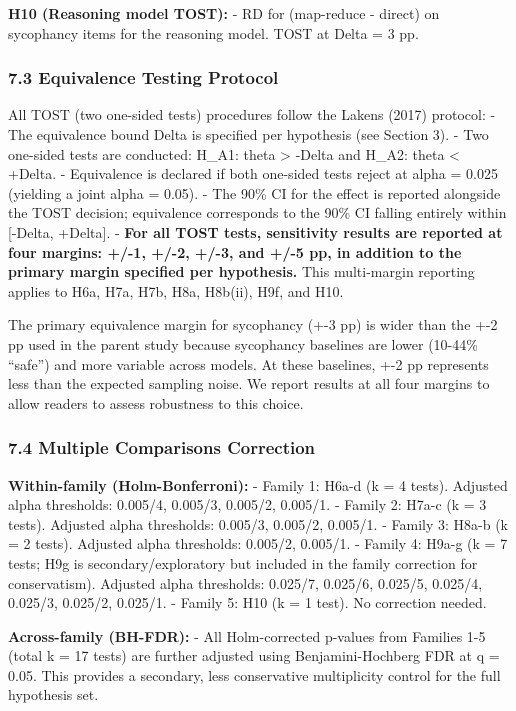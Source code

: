 \documentclass[
  11pt,
]{article}
\begin{document}
\textbf{H10 (Reasoning model TOST):} - RD for (map-reduce - direct) on
sycophancy items for the reasoning model. TOST at Delta = 3 pp.

\subsubsection{7.3 Equivalence Testing
Protocol}\label{equivalence-testing-protocol}

All TOST (two one-sided tests) procedures follow the Lakens (2017)
protocol: - The equivalence bound Delta is specified per hypothesis (see
Section 3). - Two one-sided tests are conducted: H\_A1: theta
\textgreater{} -Delta and H\_A2: theta \textless{} +Delta. - Equivalence
is declared if both one-sided tests reject at alpha = 0.025 (yielding a
joint alpha = 0.05). - The 90\% CI for the effect is reported alongside
the TOST decision; equivalence corresponds to the 90\% CI falling
entirely within {[}-Delta, +Delta{]}. - \textbf{For all TOST tests,
sensitivity results are reported at four margins: +/-1, +/-2, +/-3, and
+/-5 pp, in addition to the primary margin specified per hypothesis.}
This multi-margin reporting applies to H6a, H7a, H7b, H8a, H8b(ii), H9f,
and H10.

The primary equivalence margin for sycophancy (+-3 pp) is wider than the
+-2 pp used in the parent study because sycophancy baselines are lower
(10-44\% ``safe'') and more variable across models. At these baselines,
+-2 pp represents less than the expected sampling noise. We report
results at all four margins to allow readers to assess robustness to
this choice.

\subsubsection{7.4 Multiple Comparisons
Correction}\label{multiple-comparisons-correction}

\textbf{Within-family (Holm-Bonferroni):} - Family 1: H6a-d (k = 4
tests). Adjusted alpha thresholds: 0.005/4, 0.005/3, 0.005/2, 0.005/1. -
Family 2: H7a-c (k = 3 tests). Adjusted alpha thresholds: 0.005/3,
0.005/2, 0.005/1. - Family 3: H8a-b (k = 2 tests). Adjusted alpha
thresholds: 0.005/2, 0.005/1. - Family 4: H9a-g (k = 7 tests; H9g is
secondary/exploratory but included in the family correction for
conservatism). Adjusted alpha thresholds: 0.025/7, 0.025/6, 0.025/5,
0.025/4, 0.025/3, 0.025/2, 0.025/1. - Family 5: H10 (k = 1 test). No
correction needed.

\textbf{Across-family (BH-FDR):} - All Holm-corrected p-values from
Families 1-5 (total k = 17 tests) are further adjusted using
Benjamini-Hochberg FDR at q = 0.05. This provides a secondary, less
conservative multiplicity control for the full hypothesis set.
\end{document}
